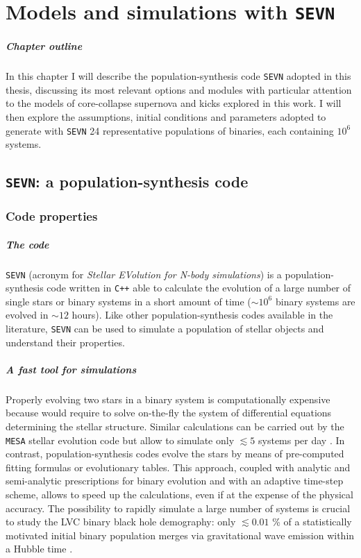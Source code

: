 \documentclass[a4paper,titlepage]{book}     	%
\begin{document}
\chapter{Models and simulations with \texttt{SEVN}}
\paragraph{Chapter outline} In this chapter I will describe the population-synthesis code \texttt{SEVN} adopted in this thesis, discussing its most relevant options and modules with particular attention to the models of core-collapse supernova and kicks explored in this work. I will then explore the assumptions, initial conditions and parameters adopted to generate with \texttt{SEVN} 24 representative populations of binaries, each containing $10^6$ systems.


\section{\texttt{SEVN}: a population-synthesis code}\label{sec:SEVN}
\subsection{Code properties}\label{subsec:SEVNproperties}
\paragraph{The code} \texttt{SEVN} (acronym for \emph{Stellar EVolution for N-body simulations}) is a population-synthesis code written in \texttt{C++} able to calculate the evolution of a large number of single stars or binary systems in a short amount of time ($\sim 10^{6}$ binary systems are evolved in $\sim 12$ hours)\cite{spera2019_mergingBBH}. Like other population-synthesis codes available in the literature, \texttt{SEVN} can be used to simulate a population of stellar objects and understand their properties.

\paragraph{A fast tool for simulations} Properly evolving two stars in a binary system is computationally expensive because would require to solve on-the-fly the system of differential equations determining the stellar structure. Similar calculations can be carried out by the \texttt{MESA} stellar evolution code but allow to simulate only $\lesssim 5$ systems per day \cite{MESA2015BinaryMT}. In contrast, population-synthesis codes evolve the stars by means of pre-computed fitting formulas or evolutionary tables. This approach, coupled with analytic and semi-analytic prescriptions for binary evolution and with an adaptive time-step scheme, allows to speed up the calculations, even if at the expense of the physical accuracy. The possibility to rapidly simulate a large number of systems is crucial to study the LVC binary black hole demography: only $\lesssim 0.01$ \% of a statistically motivated initial binary population merges via gravitational wave emission within a Hubble time \cite{spera2019_mergingBBH}.
\end{document}
